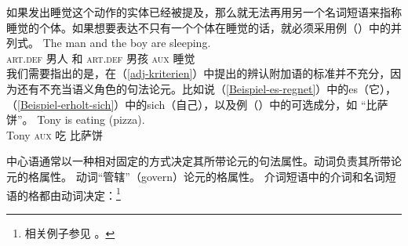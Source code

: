 \z
如果发出睡觉这个动作的实体已经被提及，那么就无法再用另一个名词短语来指称睡觉的个体。如果想要表达不只有一个个体在睡觉的话，就必须采用例（）中的并列式。
\ea
\gll The man and the boy are sleeping.\\
      \textsc{art}.\textsc{def} 男人 和 \textsc{art}.\textsc{def} 男孩  \textsc{aux} 睡觉\\
\z
我们需要指出的是，在（\ref{adj-kriterien}）中提出的辨认附加语的标准并不充分，因为还有不充当语义角色的句法论元。比如说（\ref{Beispiel-es-regnet}）中的es（它），（\ref{Beispiel-erholt-sich}）中的sich（自己），以及例（）中的可选成分，如 “比萨饼”。
\ea
\gll Tony is           eating (pizza). \\
     Tony \textsc{aux} 吃     比萨饼\\
\z

\noindent
中心语通常以一种相对固定的方式决定其所带论元的句法属性。动词负责其所带论元的格属性。
\eal
{}
\zl
动词“管辖”（govern）论元的格属性。
 介词短语中的介词和名词短语的格都由动词决定：\footnote{%
相关例子参见  。
}

